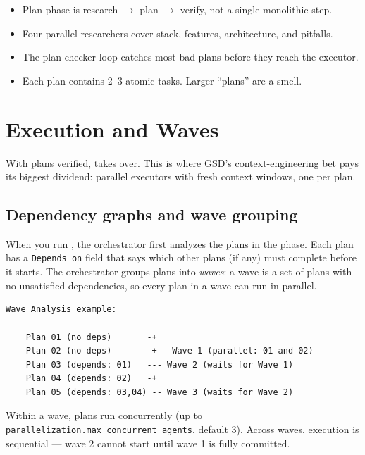 \documentclass[11pt,letterpaper,openany]{book}
\begin{document}
\begin{gsdnote}[title=Key Takeaways]
\begin{itemize}[itemsep=2pt,leftmargin=1.2em]
  \item Plan-phase is research $\rightarrow$ plan $\rightarrow$ verify, not a single monolithic step.
  \item Four parallel researchers cover stack, features, architecture, and pitfalls.
  \item The plan-checker loop catches most bad plans before they reach the executor.
  \item Each plan contains 2--3 atomic tasks. Larger ``plans'' are a smell.
\end{itemize}
\end{gsdnote}

\chapter{Execution and Waves}

With plans verified,  takes over. This is where GSD's context-engineering bet pays its biggest dividend: parallel executors with fresh context windows, one per plan.

\section{Dependency graphs and wave grouping}

When you run , the orchestrator first analyzes the plans in the phase. Each plan has a \texttt{Depends on} field that says which other plans (if any) must complete before it starts. The orchestrator groups plans into \emph{waves}: a wave is a set of plans with no unsatisfied dependencies, so every plan in a wave can run in parallel.

\begin{lstlisting}[style=gsddiagram]
  Wave Analysis example:

    Plan 01 (no deps)       -+
    Plan 02 (no deps)       -+-- Wave 1 (parallel: 01 and 02)
    Plan 03 (depends: 01)   --- Wave 2 (waits for Wave 1)
    Plan 04 (depends: 02)   -+
    Plan 05 (depends: 03,04) -- Wave 3 (waits for Wave 2)
\end{lstlisting}

Within a wave, plans run concurrently (up to \texttt{parallelization.max\_concurrent\_agents}, default 3). Across waves, execution is sequential --- wave 2 cannot start until wave 1 is fully committed.
\end{document}
